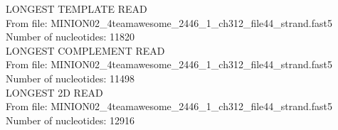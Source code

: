 
LONGEST TEMPLATE READ\\
From file: MINION02\_4teamawesome\_2446\_1\_ch312\_file44\_strand.fast5\\
Number of nucleotides: 11820\\

LONGEST COMPLEMENT READ\\
From file: MINION02\_4teamawesome\_2446\_1\_ch312\_file44\_strand.fast5\\
Number of nucleotides: 11498\\

LONGEST 2D READ\\
From file: MINION02\_4teamawesome\_2446\_1\_ch312\_file44\_strand.fast5\\
Number of nucleotides: 12916\\
